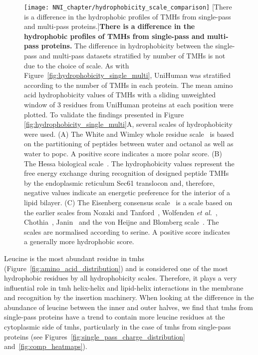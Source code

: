\begin{figure}[!ht]
\centering
\texttt{[image: NNI\_chapter/hydrophobicity\_scale\_comparison]}
[There is a difference in the hydrophobic profiles of TMHs from single-pass and multi-pass proteins.]{\textbf{There is a difference in the hydrophobic profiles of TMHs from single-pass and multi-pass proteins.}
The difference in hydrophobicity between the single-pass and multi-pass datasets stratified by number of TMHs is not due to the choice of scale.
As with Figure~\ref{fig:hydrophobicity_single_multi}, UniHuman was stratified according to the number of TMHs in each protein.
The mean amino acid hydrophobicity values of TMHs with a sliding unweighted window of 3 residues from UniHuman proteins at each position were plotted.
To validate the findings presented in Figure \ref{fig:hydrophobicity_single_multi}A, several scales of hydrophobicity were used.
(A) The White and Wimley whole residue scale~\cite{White1999} is based on the partitioning of peptides between water and octanol as well as water to \gls{popc}.
A positive score indicates a more polar score.
(B) The Hessa biological scale~\cite{Hessa2005}.
The hydrophobicity values represent the free energy exchange during recognition of designed peptide TMHs by the endoplasmic reticulum Sec61 translocon and, therefore, negative values indicate an energetic preference for the interior of a lipid bilayer.
(C) The Eisenberg consensus scale~\cite{Eisenberg1984} is a scale based on the earlier scales from Nozaki and Tanford~\cite{Nozaki1971}, Wolfenden \textit{et al.}~\cite{Wolfenden1981}, Chothia~\cite{Chothia1976}, Janin~\cite{Janin1979} and the von Heijne and Blomberg scale~\cite{VonHeijne1979}.
The scales are normalised according to serine.
A positive score indicates a generally more hydrophobic score.}

\label{fig:hydrophobicity_scale_comparison}
\end{figure}

Leucine is the most abundant residue in \gls{tmh}s (Figure~\ref{fig:amino_acid_distribution}) and is considered one of the most hydrophobic residues by all hydrophobicity scales.
Therefore, it plays a very influential role in \gls{tmh} helix-helix and lipid-helix interactions in the membrane and recognition by the insertion machinery.
When looking at the difference in the abundance of leucine between the inner and outer halves, we find that \gls{tmh}s from single-pass proteins have a trend to contain more leucine residues at the cytoplasmic side of \gls{tmh}s, particularly in the case of \gls{tmh}s from single-pass proteins (see Figures~\ref{fig:single_pass_charge_distribution} and~\ref{fig:comp_heatmaps}).

